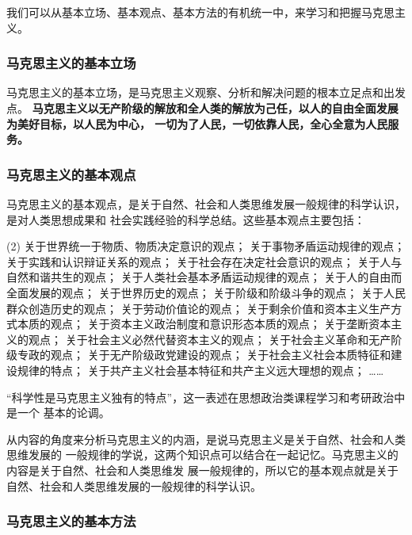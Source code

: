 \documentclass[11pt, UTF8]{book} %
\begin{document}
我们可以从基本立场、基本观点、基本方法的有机统一中，来学习和把握马克思主义。

\subsubsection{马克思主义的基本立场}

马克思主义的基本立场，是马克思主义观察、分析和解决问题的根本立足点和出发点。
\textbf{马克思主义以无产阶级的解放和全人类的解放为己任，以人的自由全面发展为美好目标，以人民为中心，
一切为了人民，一切依靠人民，全心全意为人民服务。}

\subsubsection{马克思主义的基本观点}

马克思主义的基本观点，是关于自然、社会和人类思维发展一般规律的科学认识，是对人类思想成果和
社会实践经验的科学总结。这些基本观点主要包括：
\begin{tasks}(2)
    \task 关于世界统一于物质、物质决定意识的观点；
    \task 关于事物矛盾运动规律的观点；
    \task 关于实践和认识辩证关系的观点；
    \task 关于社会存在决定社会意识的观点；
    \task 关于人与自然和谐共生的观点；
    \task 关于人类社会基本矛盾运动规律的观点；
    \task 关于人的自由而全面发展的观点；
    \task 关于世界历史的观点；
    \task 关于阶级和阶级斗争的观点；
    \task 关于人民群众创造历史的观点；
    \task 关于劳动价值论的观点；
    \task 关于剩余价值和资本主义生产方式本质的观点；
    \task 关于资本主义政治制度和意识形态本质的观点；
    \task 关于垄断资本主义的观点；
    \task 关于社会主义必然代替资本主义的观点；
    \task 关于社会主义革命和无产阶级专政的观点；
    \task 关于无产阶级政党建设的观点；
    \task 关于社会主义社会本质特征和建设规律的特点；
    \task 关于共产主义社会基本特征和共产主义远大理想的观点；
    \task ……
\end{tasks}
\begin{remark}
    “科学性是马克思主义独有的特点”，这一表述在思想政治类课程学习和考研政治中是一个
    基本的论调。
\end{remark}
\begin{remark}
    从内容的角度来分析马克思主义的内涵，是说{\kaishu 马克思主义是关于自然、社会和人类思维发展的
    一般规律的学说}，这两个知识点可以结合在一起记忆。马克思主义的内容是关于自然、社会和人类思维发
    展一般规律的，所以它的基本观点就是关于自然、社会和人类思维发展的一般规律的科学认识。
\end{remark}

\subsubsection{马克思主义的基本方法}
\end{document}
